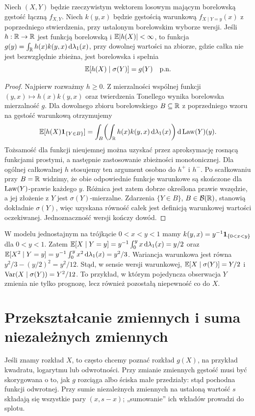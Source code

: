 \begin{twierdzenie}
Niech $(X,Y)$ będzie rzeczywistym wektorem losowym
mającym borelowską gęstość łączną $f_{X,Y}$.
Niech $k(y,x)$ będzie gęstością warunkową
$f_{X\mid Y=y}(x)$ z poprzedniego stwierdzenia,
przy ustalonym borelowskim wyborze wersji.
Jeśli $h:\mathbb{R}\to\mathbb{R}$ jest funkcją borelowską i
$\mathbb{E}|h(X)|<\infty$, to funkcja
$g(y)=\int_{\mathbb{R}} h(x)k(y,x)\,\mathrm{d}\lambda_1(x)$,
przy dowolnej wartości na zbiorze, gdzie całka nie jest
bezwzględnie zbieżna, jest borelowska i spełnia
\[
\mathbb{E}[h(X)\mid\sigma(Y)]=g(Y)\quad\text{p.n.}
\]
\end{twierdzenie}
\begin{proof}
Najpierw rozważmy $h\geq0$. Z mierzalności wspólnej
funkcji $(y,x)\mapsto h(x)k(y,x)$ oraz twierdzenia
Tonellego wynika borelowska mierzalność $g$.
Dla dowolnego zbioru borelowskiego $B\subseteq\mathbb{R}$
z poprzedniego wzoru na gęstość warunkową
otrzymujemy
\[
\mathbb{E}[h(X)\mathbf{1}_{\{Y\in B\}}]
=\int_B\!\left(\int_{\mathbb{R}} h(x)k(y,x)\,\mathrm{d}\lambda_1(x)\right)
\mathrm{d}\operatorname{Law}(Y)(y).
\]
Tożsamość dla funkcji nieujemnej można uzyskać przez
aproksymację rosnącą funkcjami prostymi, a następnie
zastosowanie zbieżności monotonicznej.
Dla ogólnej całkowalnej $h$ stosujemy ten argument
osobno do $h^+$ i $h^-$. Po scałkowaniu przy $B=\mathbb{R}$
widzimy, że obie odpowiednie funkcje warunkowe są
skończone dla $\operatorname{Law}(Y)$-prawie każdego $y$.
Różnica jest zatem dobrze określona prawie wszędzie,
a jej złożenie z $Y$ jest $\sigma(Y)$-mierzalne.
Zdarzenia $\{Y\in B\}$, $B\in\mathcal B(\mathbb{R})$,
stanowią dokładnie $\sigma(Y)$, więc uzyskana
równość całek jest definicją warunkowej wartości
oczekiwanej. Jednoznaczność wersji kończy dowód.
\end{proof}
\begin{przyklad}
W modelu jednostajnym na trójkącie $0<x<y<1$
mamy $k(y,x)=y^{-1}\mathbf{1}_{\{0<x<y\}}$ dla $0<y<1$.
Zatem
$\mathbb{E}[X\mid Y=y]=y^{-1}\int_0^y x\,\mathrm{d}\lambda_1(x)=y/2$
oraz
$\mathbb{E}[X^2\mid Y=y]=y^{-1}\int_0^y x^2\,\mathrm{d}\lambda_1(x)=y^2/3$.
Wariancja warunkowa jest równa $y^2/3-(y/2)^2=y^2/12$.
Stąd, w sensie wersji warunkowej,
$\mathbb{E}[X\mid\sigma(Y)]=Y/2$ i
$\operatorname{Var}(X\mid\sigma(Y))=Y^2/12$.
To przykład, w którym pojedyncza obserwacja $Y$
zmienia nie tylko prognozę, lecz również pozostałą
niepewność co do $X$.
\end{przyklad}

\section{Przekształcanie zmiennych i suma niezależnych zmiennych}
Jeśli znamy rozkład $X$, to często chcemy poznać rozkład
$g(X)$, na przykład kwadratu, logarytmu lub odwrotności.
Przy zmianie zmiennych gęstość musi być skorygowana o to,
jak $g$ rozciąga albo ściska małe przedziały: stąd pochodna
funkcji odwrotnej. Przy sumie niezależnych zmiennych na
ustaloną wartość $s$ składają się wszystkie pary $(x,s-x)$;
„sumowanie” ich wkładów prowadzi do splotu.

